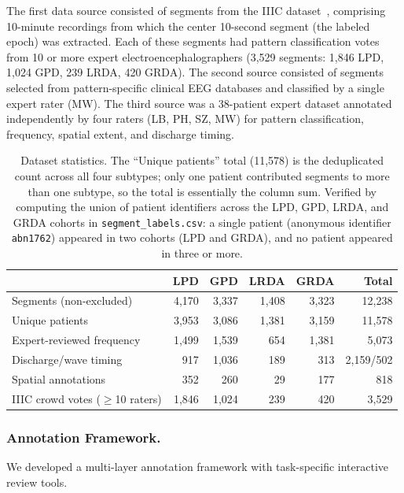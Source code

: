 \documentclass{iopjournal}
\begin{document}
The first data source consisted of segments from the IIIC dataset~\cite{jing2023}, comprising 10-minute recordings from which the center 10-second segment (the labeled epoch) was extracted. Each of these segments had pattern classification votes from 10 or more expert electroencephalographers (3,529 segments: 1,846 LPD, 1,024 GPD, 239 LRDA, 420 GRDA). The second source consisted of segments selected from pattern-specific clinical EEG databases and classified by a single expert rater (MW). The third source was a 38-patient expert dataset annotated independently by four raters (LB, PH, SZ, MW) for pattern classification, frequency, spatial extent, and discharge timing.

\begin{table}[t]
\caption{Dataset statistics. The ``Unique patients'' total (11,578) is the deduplicated count across all four subtypes; only one patient contributed segments to more than one subtype, so the total is essentially the column sum. Verified by computing the union of patient identifiers across the LPD, GPD, LRDA, and GRDA cohorts in \texttt{segment\_labels.csv}: a single patient (anonymous identifier \texttt{abn1762}) appeared in two cohorts (LPD and GRDA), and no patient appeared in three or more.}
\centering
\begin{tabular}{l r r r r r}
\hline
 & LPD & GPD & LRDA & GRDA & Total \\
\hline
Segments (non-excluded) & 4,170 & 3,337 & 1,408 & 3,323 & 12,238 \\
Unique patients & 3,953 & 3,086 & 1,381 & 3,159 & 11,578 \\
Expert-reviewed frequency & 1,499 & 1,539 & 654 & 1,381 & 5,073 \\
Discharge/wave timing & 917 & 1,036 & 189 & 313 & 2,159/502 \\
Spatial annotations & 352 & 260 & 29 & 177 & 818 \\
IIIC crowd votes ($\geq$10 raters) & 1,846 & 1,024 & 239 & 420 & 3,529 \\
\hline
\end{tabular}
\label{tab:dataset}
\end{table}

\subsubsection{Annotation Framework.}

We developed a multi-layer annotation framework with task-specific interactive review tools.
\end{document}
